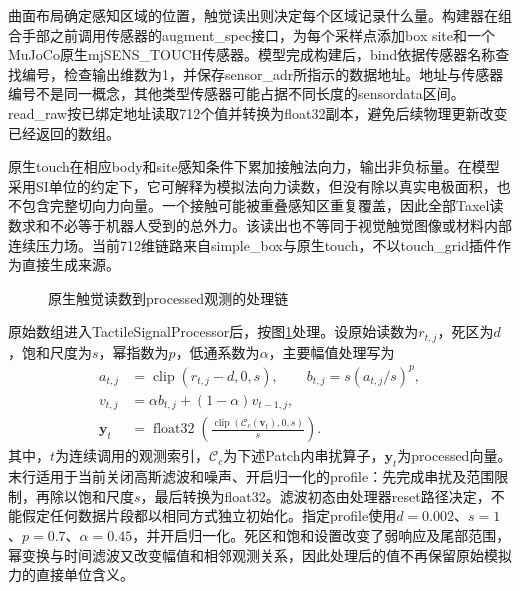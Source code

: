曲面布局确定感知区域的位置，触觉读出则决定每个区域记录什么量。构建器在组合手部之前调用传感器的augment\_spec接口，为每个采样点添加box site和一个MuJoCo原生mjSENS\_TOUCH传感器。模型完成构建后，bind依据传感器名称查找编号，检查输出维数为1，并保存sensor\_adr所指示的数据地址。地址与传感器编号不是同一概念，其他类型传感器可能占据不同长度的sensordata区间。read\_raw按已绑定地址读取712个值并转换为float32副本，避免后续物理更新改变已经返回的数组。

原生touch在相应body和site感知条件下累加接触法向力，输出非负标量\cite{mujoco2026xml}。在模型采用SI单位的约定下，它可解释为模拟法向力读数，但没有除以真实电极面积，也不包含完整切向力向量。一个接触可能被重叠感知区重复覆盖，因此全部Taxel读数求和不必等于机器人受到的总外力。该读出也不等同于视觉触觉图像或材料内部连续压力场\cite{si2022taxim,sferrazza2022simtoreal}。当前712维链路来自simple\_box与原生touch，不以touch\_grid插件作为直接生成来源。

\begin{figure}[htbp]
  \centering
  \caption{原生触觉读数到processed观测的处理链}
  \label{fig:ch02_processing}
\end{figure}

原始数组进入TactileSignalProcessor后，按图\ref{fig:ch02_processing}处理。设原始读数为$r_{t,j}$，死区为$d$，饱和尺度为$s$，幂指数为$p$，低通系数为$\alpha$，主要幅值处理写为
\begin{equation}
 \begin{aligned}
 a_{t,j}&=\operatorname{clip}(r_{t,j}-d,0,s),\qquad
 b_{t,j}=s(a_{t,j}/s)^p,\\
 v_{t,j}&=\alpha b_{t,j}+(1-\alpha)v_{t-1,j},\\
 \boldsymbol y_t&=\operatorname{float32}\!\left(
 \frac{\operatorname{clip}(\mathcal C_c(\boldsymbol v_t),0,s)}{s}\right).
 \end{aligned}
 \label{eq:ch02_processing}
\end{equation}
其中，$t$为连续调用的观测索引，$\mathcal C_c$为下述Patch内串扰算子，$\boldsymbol y_t$为processed向量。末行适用于当前关闭高斯滤波和噪声、开启归一化的profile：先完成串扰及范围限制，再除以饱和尺度$s$，最后转换为float32。滤波初态由处理器reset路径决定，不能假定任何数据片段都以相同方式独立初始化。指定profile使用$d=0.002$、$s=1$、$p=0.7$、$\alpha=0.45$，并开启归一化。死区和饱和设置改变了弱响应及尾部范围，幂变换与时间滤波又改变幅值和相邻观测关系，因此处理后的值不再保留原始模拟力的直接单位含义。

